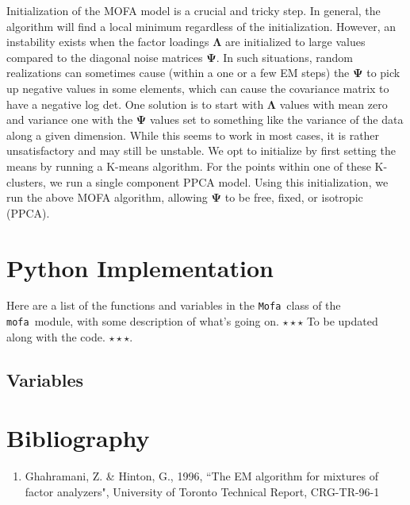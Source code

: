 \documentclass[letterpaper,12pt]{article}
\newcommand{\mofa}{\texttt{mofa}}
\newcommand{\Mofa}{\texttt{Mofa}}
\newcommand{\vect}[1]{\boldsymbol{#1}}
\newcommand{\lmda}{\vect{\Lambda}}
\newcommand{\ps}{\vect{\Psi}}
\begin{document}
Initialization of the MOFA model is a crucial and tricky step.  In general, the algorithm 
will find a local minimum regardless of the initialization.  However, an instability 
exists when the factor loadings $\lmda$ are initialized to large values compared to 
the diagonal noise matrices $\ps$.  In such situations, random realizations can 
sometimes cause (within a one or a few EM steps) the $\ps$ to pick up negative 
values in some elements, which can cause the covariance matrix to have a negative 
log det.  One solution is to start with $\lmda$ values with mean zero and variance one 
with the $\ps$ values set to something like the variance of the data along a given 
dimension.  While this seems to work in most cases, it is rather unsatisfactory and may 
still be unstable.  We opt to initialize by first setting the means by running a K-means 
algorithm.  For the points within one of these K-clusters, we run a single component 
PPCA model.  Using this initialization, we run the above MOFA algorithm, allowing 
$\ps$ to be free, fixed, or isotropic (PPCA).

\section{Python Implementation}

Here are a list of the functions and variables in the \Mofa\ class of
the \mofa\ module, with some description of what's going on.
$\star\star\star$ To be updated along with the
code. $\star\star\star$.

\subsection{Variables}

\texttt{}

\section{Bibliography}

\begin{enumerate}
\item Ghahramani, Z. \& Hinton, G., 1996, ``The EM algorithm for mixtures of factor 
analyzers", University of Toronto Technical Report, CRG-TR-96-1
\end{enumerate}
\end{document}
